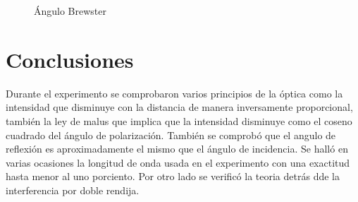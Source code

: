 \documentclass[aps,prl,reprint]{revtex4-1}
\begin{document}
\begin{figure}[H]
\begin{center}
 \caption{\'Angulo Brewster}
 \label{grmonta11}
 \end{center}
\end{figure}

\section{Conclusiones}
Durante el experimento se comprobaron varios principios de la óptica como la intensidad que disminuye con la distancia de manera inversamente proporcional, también la ley de malus que implica que la intensidad disminuye como el coseno cuadrado del ángulo de polarización. 
También se comprobó que el angulo de reflexión es aproximadamente el mismo que el ángulo de incidencia. Se halló en varias ocasiones la longitud de onda usada en el experimento con una exactitud hasta menor al uno porciento.
Por otro lado se verificó la teoria detrás dde la interferencia por doble rendija.
\end{document}
